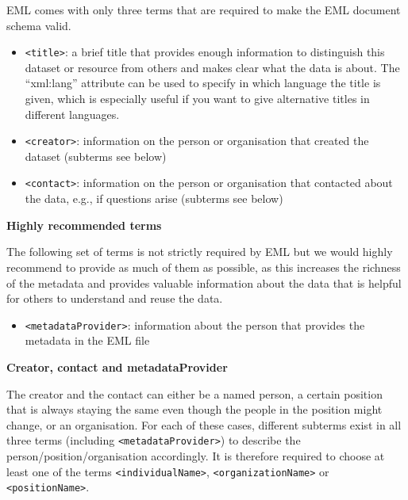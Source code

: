 \documentclass[
]{book}
\providecommand{\tightlist}{%
  \setlength{\itemsep}{0pt}\setlength{\parskip}{0pt}}
\begin{document}
EML comes with only three terms that are required to make the EML document schema valid.

\begin{itemize}
\item
  {\texttt{\textless{}title\textgreater{}}}: a brief title that provides enough information to distinguish this dataset or resource from others and makes clear what the data is about. The ``xml:lang'' attribute can be used to specify in which language the title is given, which is especially useful if you want to give alternative titles in different languages.
\item
  {\texttt{\textless{}creator\textgreater{}}}: information on the person or organisation that created the dataset (subterms see below)
\item
  {\texttt{\textless{}contact\textgreater{}}}: information on the person or organisation that contacted about the data, e.g., if questions arise (subterms see below)
\end{itemize}

{\textbf{Highly recommended terms}}

The following set of terms is not strictly required by EML but we would highly recommend to provide as much of them as possible, as this increases the richness of the metadata and provides valuable information about the data that is helpful for others to understand and reuse the data.

\begin{itemize}
\tightlist
\item
  {\texttt{\textless{}metadataProvider\textgreater{}}}: information about the person that provides the metadata in the EML file
\end{itemize}

\textbf{Creator, contact and metadataProvider}

The creator and the contact can either be a named person, a certain position that is always staying the same even though the people in the position might change, or an organisation. For each of these cases, different subterms exist in all three terms (including \texttt{\textless{}metadataProvider\textgreater{}}) to describe the person/position/organisation accordingly. It is therefore required to choose at least one of the terms \texttt{\textless{}individualName\textgreater{}}, \texttt{\textless{}organizationName\textgreater{}} or \texttt{\textless{}positionName\textgreater{}}.
\end{document}
